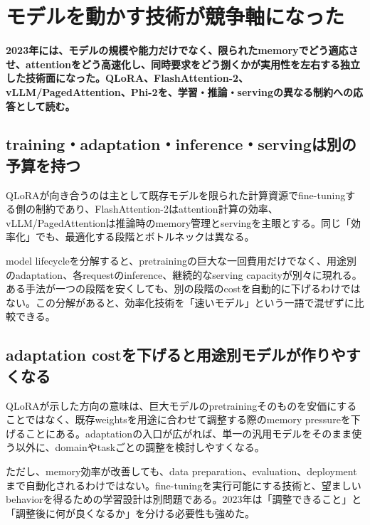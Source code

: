 \section{モデルを動かす技術が競争軸になった}
\noindent\textbf{2023年には、モデルの規模や能力だけでなく、限られたmemoryでどう適応させ、attentionをどう高速化し、同時要求をどう捌くかが実用性を左右する独立した技術面になった。QLoRA、FlashAttention-2、vLLM/PagedAttention、Phi-2を、学習・推論・servingの異なる制約への応答として読む。}\autocite{src-1ab9d44a819a,src-5e1a3a4fc45b,src-6e61359d2fae,src-7f830e688335,src-e03b0ba5b24e,src-fb804ac849e4}

\subsection{training・adaptation・inference・servingは別の予算を持つ}

QLoRAが向き合うのは主として既存モデルを限られた計算資源でfine-tuningする側の制約であり、FlashAttention-2はattention計算の効率、vLLM/PagedAttentionは推論時のmemory管理とservingを主眼とする。同じ「効率化」でも、最適化する段階とボトルネックは異なる。\autocite{src-1ab9d44a819a,src-5e1a3a4fc45b,src-7f830e688335,src-e03b0ba5b24e,src-fb804ac849e4}


model lifecycleを分解すると、pretrainingの巨大な一回費用だけでなく、用途別のadaptation、各requestのinference、継続的なserving capacityが別々に現れる。ある手法が一つの段階を安くしても、別の段階のcostを自動的に下げるわけではない。この分解があると、効率化技術を「速いモデル」という一語で混ぜずに比較できる。\autocite{src-1ab9d44a819a,src-5e1a3a4fc45b,src-7f830e688335,src-e03b0ba5b24e,src-fb804ac849e4}


\subsection{adaptation costを下げると用途別モデルが作りやすくなる}

QLoRAが示した方向の意味は、巨大モデルのpretrainingそのものを安価にすることではなく、既存weightsを用途に合わせて調整する際のmemory pressureを下げることにある。adaptationの入口が広がれば、単一の汎用モデルをそのまま使う以外に、domainやtaskごとの調整を検討しやすくなる。\autocite{src-7f830e688335}


ただし、memory効率が改善しても、data preparation、evaluation、deploymentまで自動化されるわけではない。fine-tuningを実行可能にする技術と、望ましいbehaviorを得るための学習設計は別問題である。2023年は「調整できること」と「調整後に何が良くなるか」を分ける必要性も強めた。\autocite{src-7f830e688335}


